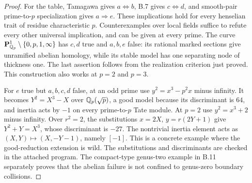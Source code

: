 \begin{proof}
For the table, Tamagawa gives $a\Leftrightarrow b$, B.7 gives
$c\Leftrightarrow d$, and smooth-pair prime-to-$p$ specialization gives
$a\Rightarrow e$. These implications hold for every henselian trait of
residue characteristic $p$. Counterexamples over local fields suffice to
refute every other universal implication, and can be given at every prime.
The curve $\mathbf P^1_{\mathbb Q_p}\setminus\{0,p,1,\infty\}$ has $c,d$ true
and $a,b,e$ false: its rational marked sections give unramified abelian
homology, while its stable model has one separating node of thickness one.
The last assertion follows from the realization criterion just proved.
This construction also works at $p=2$ and $p=3$.

For $e$ true but $a,b,c,d$ false, at an odd prime use
$y^2=x^3-p^2x$ minus infinity. It becomes $Y^2=X^3-X$ over
$\mathbb Q_p(\sqrt p)$, a good model because its discriminant is $64$, and
inertia acts by $-1$ on every prime-to-$p$ Tate module. At $p=2$ use
$y^2=x^3+2$ minus infinity. Over $r^2=2$, the substitutions
$x=2X$, $y=r(2Y+1)$ give $Y^2+Y=X^3$, whose discriminant is $-27$.
The nontrivial inertia element acts as $(X,Y)\mapsto(X,-Y-1)$, namely
$[-1]$. This is a concrete example where the good-reduction extension
is wild. The substitutions and discriminants are checked in the attached
program. The compact-type genus-two example in B.11 separately proves
that the abelian failure is not confined to genus-zero boundary collisions.
\end{proof}

